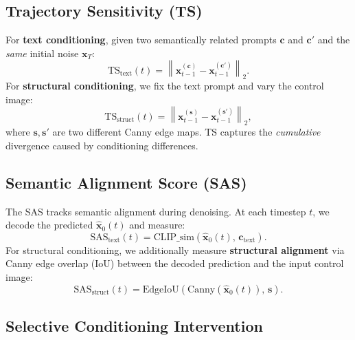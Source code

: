 \documentclass{article}
\begin{document}
\subsection{Trajectory Sensitivity (TS)}

For \textbf{text conditioning}, given two semantically related prompts $\mathbf{c}$ and $\mathbf{c}'$ and the \emph{same} initial noise $\mathbf{x}_T$:
\begin{equation}
    \text{TS}_{\text{text}}(t) = \left\| \mathbf{x}_{t-1}^{(\mathbf{c})} - \mathbf{x}_{t-1}^{(\mathbf{c}')} \right\|_2.
    \label{eq:ts_text}
\end{equation}
For \textbf{structural conditioning}, we fix the text prompt and vary the control image:
\begin{equation}
    \text{TS}_{\text{struct}}(t) = \left\| \mathbf{x}_{t-1}^{(\mathbf{s})} - \mathbf{x}_{t-1}^{(\mathbf{s}')} \right\|_2,
    \label{eq:ts_struct}
\end{equation}
where $\mathbf{s}, \mathbf{s}'$ are two different Canny edge maps. TS captures the \emph{cumulative} divergence caused by conditioning differences.

\subsection{Semantic Alignment Score (SAS)}

The SAS tracks semantic alignment during denoising. At each timestep $t$, we decode the predicted $\hat{\mathbf{x}}_0(t)$ and measure:
\begin{equation}
    \text{SAS}_{\text{text}}(t) = \text{CLIP\_sim}\!\left(\hat{\mathbf{x}}_0(t),\, \mathbf{c}_{\text{text}}\right).
    \label{eq:sas_text}
\end{equation}
For structural conditioning, we additionally measure \textbf{structural alignment} via Canny edge overlap (IoU) between the decoded prediction and the input control image:
\begin{equation}
    \text{SAS}_{\text{struct}}(t) = \text{EdgeIoU}\!\left(\text{Canny}(\hat{\mathbf{x}}_0(t)),\, \mathbf{s}\right).
    \label{eq:sas_struct}
\end{equation}

\subsection{Selective Conditioning Intervention}
\end{document}
